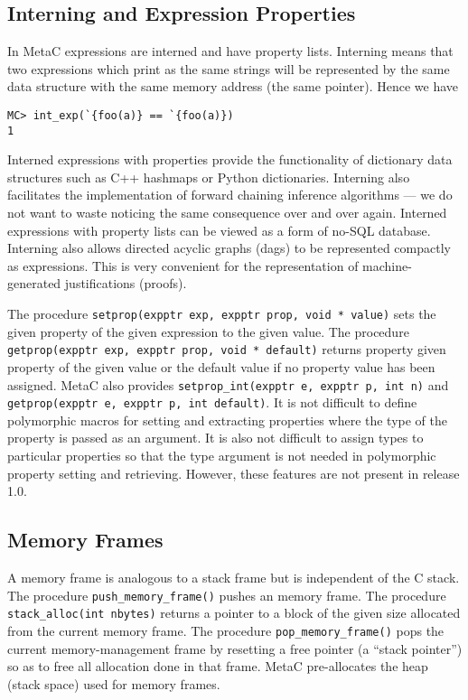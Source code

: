 \documentclass{article}
\begin{document}
\subsection{Interning and Expression Properties}

In MetaC expressions are interned and have property lists.
Interning means that two expressions which print as the same strings will be represented by the same data structure with the same memory address (the same pointer).
Hence we have
\begin{verbatim}
MC> int_exp(`{foo(a)} == `{foo(a)})
1
\end{verbatim}
Interned expressions with properties provide the functionality of dictionary data structures such as C++ hashmaps or Python dictionaries.
Interning also facilitates the implementation of forward chaining inference algorithms --- we do not want to waste noticing the same
consequence over and over again.  Interned expressions with property lists can be viewed as a form of no-SQL database.
Interning also allows directed acyclic graphs (dags) to be represented compactly as expressions.  This is very convenient
for the representation of machine-generated justifications (proofs).

The procedure {\tt setprop(expptr exp, expptr prop, void * value)}
sets the given property of the given expression to the given value.  The procedure {\tt getprop(expptr exp, expptr prop, void * default)}
returns property given property of the given value or the default value if no property value has been assigned.
MetaC also provides {\tt setprop\_int(expptr e, expptr p, int n)} and {\tt getprop(expptr e, expptr p, int default)}.
It is not difficult to define polymorphic macros for setting and extracting properties where the type of the property is passed as an argument.
It is also not difficult to assign types to particular properties so that the type argument is not needed in polymorphic property setting and retrieving.
However, these features are not present in release 1.0.

\subsection{Memory Frames}
A memory frame is analogous to a stack frame but is independent of the C stack.
The procedure {\tt push\_memory\_frame()} pushes an memory frame.  The procedure {\tt stack\_alloc(int nbytes)}
returns a pointer to a block of the given size allocated from the current memory frame.  The procedure {\tt pop\_memory\_frame()}
pops the current memory-management frame by resetting a free pointer (a ``stack pointer'') so as to free all allocation done in that frame.
MetaC pre-allocates the heap (stack space) used for memory frames.
\end{document}
